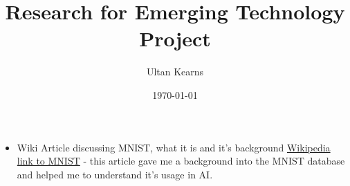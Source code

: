 \documentclass[12pt, letterpaper]{article}
\title{Research for Emerging Technology Project}
\author{Ultan Kearns}
\date{\today}
\begin{document}
\begin{titlepage}
\maketitle
\end{titlepage}
\begin{itemize}
\item Wiki Article discussing MNIST, what it is and it's background
\href{https://en.wikipedia.org/wiki/MNIST_database}{Wikipedia link to MNIST} -
this article gave me a background into the MNIST database and helped me to understand
it's usage in AI.
\end{itemize}
\end{document}
